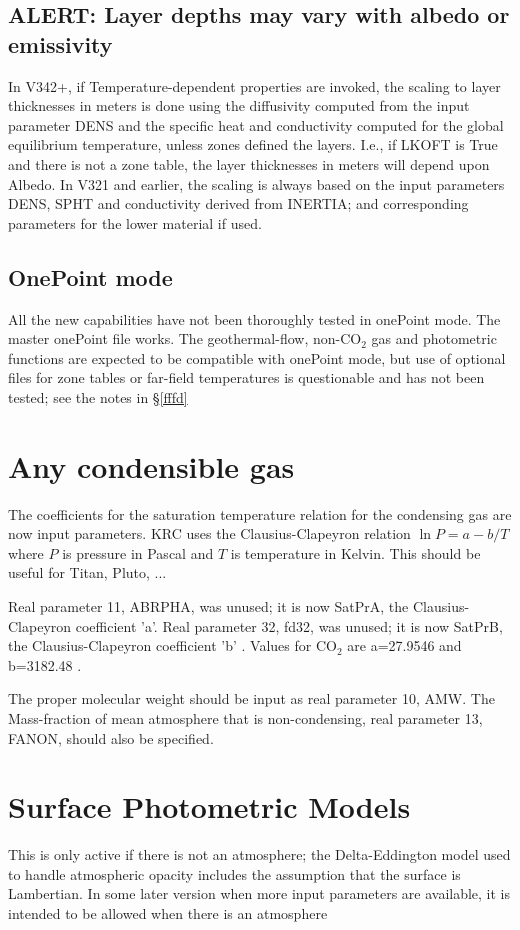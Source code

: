 \documentclass{article}
\begin{document}
\subsection{ALERT: Layer depths may vary with albedo or emissivity}

In V342+, if Temperature-dependent properties are invoked, the scaling to layer
thicknesses in meters is done using the diffusivity computed from the input
parameter DENS and the specific heat and conductivity computed for the global
equilibrium temperature, unless zones defined the layers.  I.e., if LKOFT is
True and there is not a zone table, the layer thicknesses in meters will depend
upon Albedo. In V321 and earlier, the scaling is always based on the input
parameters DENS, SPHT and conductivity derived from INERTIA; and corresponding
parameters for the lower material if used.

\subsection{OnePoint mode}
All the new capabilities have not been thoroughly tested in onePoint mode. The
master onePoint file  works. The geothermal-flow, non-CO$_2$ gas
and photometric functions are expected to be compatible with onePoint mode, but
use of optional files for zone tables or far-field temperatures is questionable
and has not been tested; see the notes in \S \ref{fffd}

\section{Any condensible gas \label{gas}}

The coefficients for the saturation temperature relation for the condensing gas
are now input parameters. KRC uses the Clausius-Clapeyron relation $\ln P = a -
b/T$ where $P$ is pressure in Pascal and $T$ is temperature in Kelvin. This
should be useful for Titan, Pluto, ...

Real parameter 11, ABRPHA, was unused; it is now SatPrA, the Clausius-Clapeyron
coefficient 'a'. Real parameter 32, fd32, was unused; it is now SatPrB, the
Clausius-Clapeyron coefficient 'b' .  Values for CO$_2$ are a=27.9546 and
b=3182.48 .

The proper molecular weight should be input as real parameter 10, AMW. The
Mass-fraction of mean atmosphere that is non-condensing, real parameter 13,
FANON, should also be specified.

\section{Surface Photometric Models \label{pm} }
This is only active if there is not an atmosphere; the Delta-Eddington model
used to handle atmospheric opacity includes the assumption that the surface is
Lambertian. In some later version when more input parameters are available, it
is intended to be allowed when there is an atmosphere
\end{document}

